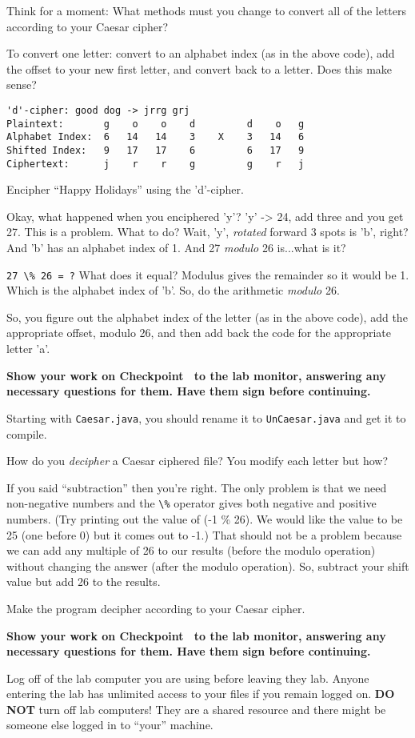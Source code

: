 \documentclass[12pt,oneside]{memoir}
\newcommand\code[1]{\lstinline^#1^}
\newcommand\fname[1]{\texttt{#1}}
\newenvironment{Checkpoint}[1]{%
  \begin{Exercise}[name={Checkpoint},title={#1}]}{%
  \end{Exercise}%
  \textbf{Show your work on Checkpoint~\theExercise{} to the lab monitor, %
    answering any necessary questions for them.  Have them sign before continuing.}}
\begin{document}
\begin{Checkpoint}{Caesar.java}
  Think for a moment: What methods must you change to convert all of
  the letters according to your Caesar cipher?

  To convert one letter: convert to an alphabet index (as in the above
  code), add the offset to your new first letter, and convert back to
  a letter. Does this make sense?

  \begin{lstlisting}
'd'-cipher: good dog -> jrrg grj
Plaintext:       g    o    o    d         d    o   g
Alphabet Index:  6   14   14    3    X    3   14   6
Shifted Index:   9   17   17    6         6   17   9
Ciphertext:      j    r    r    g         g    r   j
  \end{lstlisting}

  Encipher ``Happy Holidays'' using the 'd'-cipher.

  Okay, what happened when you enciphered 'y'? 'y' -> 24, add three
  and you get 27. This is a problem. What to do? Wait, 'y',
  \emph{rotated} forward 3 spots is 'b', right? And 'b' has an
  alphabet index of 1. And 27 \emph{modulo} 26 is...what is it?

  \code{27 \% 26 = ?} What does it equal? Modulus gives the remainder
  so it would be 1. Which is the alphabet index of 'b'. So, do the
  arithmetic \emph{modulo} 26.

  So, you figure out the alphabet index of the letter (as in the above
  code), add the appropriate offset, modulo 26, and then add back the
  code for the appropriate letter 'a'.
\end{Checkpoint}

\begin{Checkpoint}{UnCaesar.java}
Starting with \fname{Caesar.java}, you should rename it to
\code{UnCaesar.java} and get it to compile.

How do you \emph{decipher} a Caesar ciphered file? You modify each
letter but how?

If you said ``subtraction'' then you're right. The only problem is
that we need non-negative numbers and the \code{\%} operator gives
both negative and positive numbers. (Try printing out the value of (-1
\% 26). We would like the value to be 25 (one before 0) but it comes
out to -1.) That should not be a problem because we can add any
multiple of 26 to our results (before the modulo operation) without
changing the answer (after the modulo operation). So, subtract your
shift value but add 26 to the results.

Make the program decipher according to your Caesar cipher.

\end{Checkpoint}

\Large{Log off of the lab computer you are using before leaving they
  lab. Anyone entering the lab has unlimited access to your files if
  you remain logged on. \textbf{DO NOT} turn off lab computers! They
  are a shared resource and there might be someone else logged in to
  ``your'' machine.}
\end{document}
